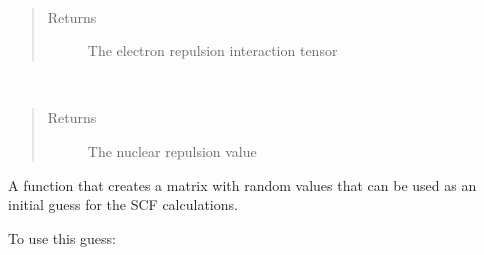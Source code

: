 \documentclass[letterpaper,10pt,english]{sphinxmanual}
\begin{document}
\begin{fulllineitems}

\begin{fulllineitems}
\label{\detokenize{GHF:hf.HartreeFock.GHF.MF.get_two_e}}~\begin{quote}\begin{description}
\item[{Returns}] \leavevmode
The electron repulsion interaction tensor

\end{description}\end{quote}

\end{fulllineitems}


\begin{fulllineitems}
\label{\detokenize{GHF:hf.HartreeFock.GHF.MF.nuc_rep}}~\begin{quote}\begin{description}
\item[{Returns}] \leavevmode
The nuclear repulsion value

\end{description}\end{quote}

\end{fulllineitems}


\begin{fulllineitems}
\label{\detokenize{GHF:hf.HartreeFock.GHF.MF.random_guess}}
A function that creates a matrix with random values that can be used as an initial guess
for the SCF calculations.

To use this guess:


\end{fulllineitems}
\end{fulllineitems}
\end{document}
